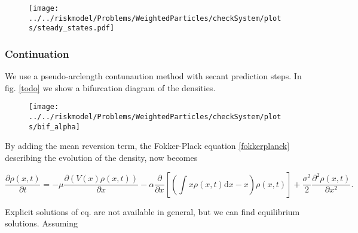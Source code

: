 \documentclass[]{article}
\newcommand{\pa}[2]{\frac{\partial #1}{\partial #2}}
\newcommand{\ppa}[2]{\frac{\partial^2 #1}{\partial #2^2}}
\begin{document}
\begin{center}
\begin{figure}
\texttt{[image: ../../riskmodel/Problems/WeightedParticles/checkSystem/plots/steady\_states.pdf]}
\caption{\label{fig:bif_anal}}
\end{figure}
\end{center}



\subsubsection{Continuation}
We use a pseudo-arclength contunaution method with secant prediction steps.
In fig. \ref{todo} we show a bifurcation diagram of the densities. 



\begin{center}
\begin{figure}
\texttt{[image: ../../riskmodel/Problems/WeightedParticles/checkSystem/plots/bif\_alpha]}
\caption{\label{fig:bif_anal}}
\end{figure}
\end{center}




%
%


By adding the mean reversion term, the Fokker-Plack equation \eqref{fokkerplanck}  describing the evolution of the density, now becomes

\begin{equation}
\label{fp_mean_field}
\pa{\rho(x,t)}{t} = - \mu \pa{( V(x) \rho(x,t))}{x} - \alpha \pa{}{x} \left[ \left(\int x \rho(x,t) \mathrm{d}x  -x \right) \rho(x,t) \right] + \frac{\sigma^2}{2}  \ppa{\rho(x,t)}{x} .
\end{equation}

Explicit solutions of eq. \label{fp_mean_field} are not available in general, but we can find equilibrium solutions. Assuming 




\end{document}
